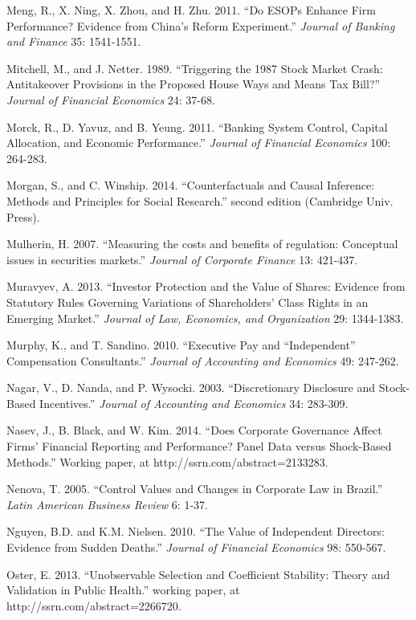 \noindent Meng, R., X. Ning, X. Zhou, and H. Zhu. 2011. ``Do ESOPs Enhance Firm Performance? Evidence from China's Reform Experiment.''  \textit{Journal of Banking and Finance} 35: 1541-1551.

\noindent Mitchell, M., and J. Netter. 1989. ``Triggering the 1987 Stock Market Crash:  Antitakeover Provisions in the Proposed House Ways and Means Tax Bill?''  \textit{Journal of Financial Economics} 24: 37-68.

\noindent Morck, R., D. Yavuz, and B. Yeung. 2011. ``Banking System Control, Capital Allocation, and Economic Performance.''  \textit{Journal of Financial Economics} 100: 264-283.

\noindent Morgan, S., and C. Winship. 2014. ``Counterfactuals and Causal Inference:  Methods and Principles for Social Research.'' second edition (Cambridge Univ. Press).

\noindent Mulherin, H. 2007. ``Measuring the costs and benefits of regulation: Conceptual issues in securities markets.'' \textit{Journal of Corporate Finance} 13: 421-437.

\noindent Muravyev, A. 2013. ``Investor Protection and the Value of Shares:  Evidence from Statutory Rules Governing Variations of Shareholders' Class Rights in an Emerging Market.'' \textit{Journal of Law, Economics, and Organization} 29: 1344-1383. 

\noindent Murphy, K., and T. Sandino. 2010. ``Executive Pay and ``Independent'' Compensation Consultants.'' \textit{Journal of Accounting and Economics} 49: 247-262.

\noindent Nagar, V., D. Nanda, and P. Wysocki. 2003. ``Discretionary Disclosure and Stock-Based Incentives.''  \textit{Journal of Accounting and Economics} 34: 283-309.

\noindent Nasev, J., B. Black, and W. Kim.  2014.  ``Does Corporate Governance Affect Firms' Financial Reporting and Performance?  Panel Data versus Shock-Based Methods.''  Working paper, at http://ssrn.com/abstract=2133283.

\noindent Nenova, T. 2005. ``Control Values and Changes in Corporate Law in Brazil.''  \textit{Latin American Business Review} 6: 1-37.

\noindent Nguyen, B.D. and K.M. Nielsen. 2010. ``The Value of Independent Directors: Evidence from Sudden Deaths.''  \textit{Journal of Financial Economics} 98: 550-567. 

\noindent Oster, E. 2013. ``Unobservable Selection and Coefficient Stability:  Theory and Validation in Public Health.'' working paper, at http://ssrn.com/abstract=2266720.\textbf{}

